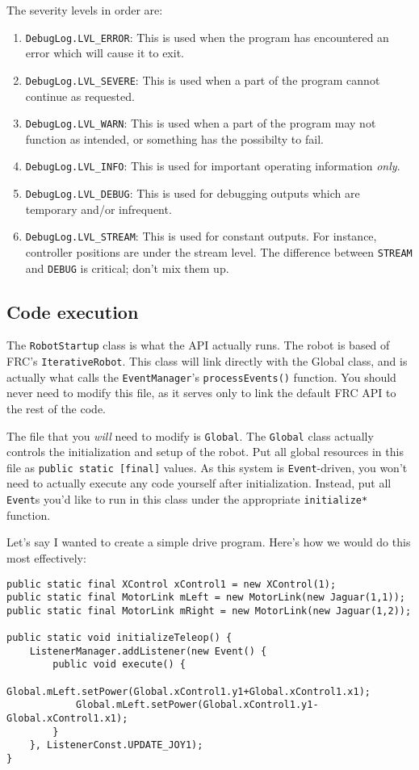 \documentclass[a4paper]{article}
\begin{document}
The severity levels in order are:

\begin{enumerate}\item{\lstinline{DebugLog.LVL_ERROR}: This is used when the program has encountered an error which will cause it to exit.}\item{\lstinline{DebugLog.LVL_SEVERE}: This is used when a part of the program cannot continue as requested.}\item{\lstinline{DebugLog.LVL_WARN}: This is used when a part of the program may not function as intended, or something has the possibilty to fail.}\item{\lstinline{DebugLog.LVL_INFO}: This is used for important operating information \textit{only}.}\item{\lstinline{DebugLog.LVL_DEBUG}: This is used for debugging outputs which are temporary and/or infrequent.}\item{\lstinline{DebugLog.LVL_STREAM}: This is used for constant outputs. For instance, controller positions are under the stream level. The difference between \lstinline{STREAM} and \lstinline{DEBUG} is critical; don't mix them up.}\end{enumerate}

\subsection{Code execution}
The \lstinline{RobotStartup} class is what the API actually runs. The robot is based of FRC's \lstinline{IterativeRobot}. This class will link directly with the Global class, and is actually what calls the \lstinline{EventManager}'s \lstinline{processEvents()} function. You should never need to modify this file, as it serves only to link the default FRC API to the rest of the code.

The file that you \textit{will} need to modify is \lstinline{Global}. The \lstinline{Global} class actually controls the initialization and setup of the robot. Put all global resources in this file as \lstinline{public static [final]} values. As this system is \lstinline{Event}-driven, you won't need to actually execute any code yourself after initialization. Instead, put all \lstinline{Event}s you'd like to run in this class under the appropriate \lstinline{initialize*} function.

Let's say I wanted to create a simple drive program. Here's how we would do this most effectively:

\begin{lstlisting}
public static final XControl xControl1 = new XControl(1);
public static final MotorLink mLeft = new MotorLink(new Jaguar(1,1));
public static final MotorLink mRight = new MotorLink(new Jaguar(1,2));

public static void initializeTeleop() {
    ListenerManager.addListener(new Event() {
        public void execute() {
            Global.mLeft.setPower(Global.xControl1.y1+Global.xControl1.x1);
            Global.mLeft.setPower(Global.xControl1.y1-Global.xControl1.x1);
        }
    }, ListenerConst.UPDATE_JOY1);
}\end{lstlisting}
\end{document}
